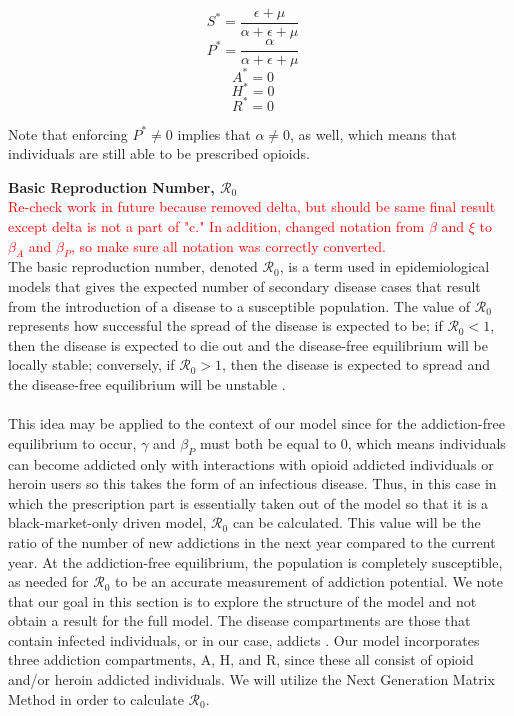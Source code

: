 \documentclass[12pt]{article}
\begin{document}
\[S^*=\frac{\epsilon + \mu}{\alpha + \epsilon +\mu}\quad\]
\[P^*=\frac{\alpha}{\alpha + \epsilon +\mu}\quad\]
\[A^*=0\quad\]
\[H^*=0\quad\]
\[R^*=0\quad\] 

Note that enforcing $P^* \neq 0$ implies that $\alpha \neq 0$, as well, which means that individuals are still able to be prescribed opioids. 





\textbf{Basic Reproduction Number, \textbf{$\mathscr{R}_0$}} \\
\textcolor{red}{Re-check work in future because removed delta, but should be same final result except 
delta is not a part of "c." In addition, changed notation from $\beta$ and $\xi$ to $\beta_{A}$ and $\beta_{P}$, so make sure all notation was correctly converted.} \\

The basic reproduction number, denoted $\mathscr{R}_0$, is a term used in epidemiological models that gives the expected number of secondary disease cases that result from the introduction of a disease to a susceptible population. The value of $\mathscr{R}_0$ represents how successful the spread of the disease is expected to be; if $\mathscr{R}_0 < 1$, then the disease is expected to die out and the disease-free equilibrium will be locally stable; conversely, if $\mathscr{R}_0 >1$, then the disease is expected to spread and the disease-free equilibrium will be unstable \cite{Driessche}. \\ \\
 This idea may be applied to the context of our model since for the addiction-free equilibrium to occur, $\gamma$ and $\beta_{P}$ must both be equal to 0, which means individuals can become addicted only with interactions with opioid addicted individuals or heroin users so this takes the form of an infectious disease. Thus, in this case in which the prescription part is essentially taken out of the model so that it is a black-market-only driven model, $\mathscr{R}_0$ can be calculated. This value will be the ratio of the number of new addictions in the next year compared to the current year. At the addiction-free equilibrium, the population is completely susceptible, as needed for $\mathscr{R}_0$ to be an accurate measurement of addiction potential. 
We note that our goal in this section is to explore the structure of the model and not obtain a result for the full model. The disease compartments are those that contain infected individuals, or in our case, addicts \cite{Driessche}. Our model incorporates three addiction compartments, A, H, and R, since these all consist of opioid and/or heroin addicted individuals. We will utilize the Next Generation Matrix Method in order to calculate $\mathscr{R}_0$.
\end{document}
